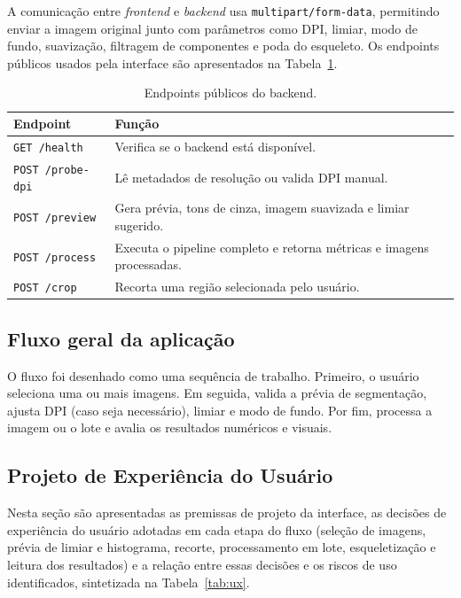 \documentclass[12pt]{article}
\begin{document}
A comunicação entre \textit{frontend} e \textit{backend} usa \texttt{multipart/form-data}, permitindo enviar a imagem original junto com parâmetros como DPI, limiar, modo de fundo, suavização, filtragem de componentes e poda do esqueleto. Os endpoints públicos usados pela interface são apresentados na Tabela~\ref{tab:endpoints}.

\vspace{5mm}

\begin{table}[!htbp]
\centering
\caption{Endpoints públicos do backend.}
\label{tab:endpoints}
\begin{tabular}{p{3.8cm}p{9.9cm}}
\toprule
Endpoint & Função \\
\midrule
\texttt{GET /health} & Verifica se o backend está disponível. \\
\texttt{POST /probe-dpi} & Lê metadados de resolução ou valida DPI manual. \\
\texttt{POST /preview} & Gera prévia, tons de cinza, imagem suavizada e limiar sugerido. \\
\texttt{POST /process} & Executa o pipeline completo e retorna métricas e imagens processadas. \\
\texttt{POST /crop} & Recorta uma região selecionada pelo usuário. \\
\bottomrule
\end{tabular}
\end{table}

\subsection{Fluxo geral da aplicação}

O fluxo foi desenhado como uma sequência de trabalho. Primeiro, o usuário seleciona uma ou mais imagens. Em seguida, valida a prévia de segmentação, ajusta DPI (caso seja necessário), limiar e modo de fundo. Por fim, processa a imagem ou o lote e avalia os resultados numéricos e visuais.

\subsection{Projeto de Experiência do Usuário}

Nesta seção são apresentadas as premissas de projeto da interface, as decisões de experiência do usuário adotadas em cada etapa do fluxo (seleção de imagens, prévia de limiar e histograma, recorte, processamento em lote, esqueletização e leitura dos resultados) e a relação entre essas decisões e os riscos de uso identificados, sintetizada na Tabela~\ref{tab:ux}.
\end{document}
